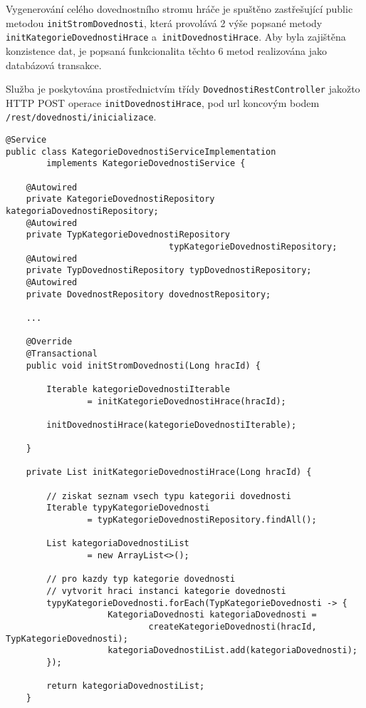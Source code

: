 \documentclass[12pt]{article}
\begin{document}
{Vygenerování celého dovednostního stromu hráče je spuštěno zastřešující public metodou \texttt{initStromDovednosti}, která provolává 2 výše popsané metody \texttt{initKategorieDovednostiHrace} a~\texttt{initDovednostiHrace}. Aby byla zajištěna konzistence dat, je popsaná funkcionalita těchto 6 metod realizována jako databázová transakce. 

Služba je poskytována prostřednictvím třídy \texttt{DovednostiRestController} jakožto HTTP POST operace \texttt{initDovednostiHrace}, pod url koncovým bodem \texttt{/rest/dovednosti/inicializace}.

\begin{lstlisting}
@Service
public class KategorieDovednostiServiceImplementation 
        implements KategorieDovednostiService {
        
    @Autowired
    private KategorieDovednostiRepository kategoriaDovednostiRepository;
    @Autowired
    private TypKategorieDovednostiRepository 
                                typKategorieDovednostiRepository;
    @Autowired
    private TypDovednostiRepository typDovednostiRepository;
    @Autowired
    private DovednostRepository dovednostRepository;
    
    ...
    
    @Override
    @Transactional
    public void initStromDovednosti(Long hracId) {
        
        Iterable kategorieDovednostiIterable
                = initKategorieDovednostiHrace(hracId);

        initDovednostiHrace(kategorieDovednostiIterable);

    }
    
    private List initKategorieDovednostiHrace(Long hracId) {

        // ziskat seznam vsech typu kategorii dovednosti
        Iterable typyKategorieDovednosti
                = typKategorieDovednostiRepository.findAll();
    
        List kategoriaDovednostiList
                = new ArrayList<>();
    
        // pro kazdy typ kategorie dovednosti
        // vytvorit hraci instanci kategorie dovednosti
        typyKategorieDovednosti.forEach(TypKategorieDovednosti -> {
                    KategoriaDovednosti kategoriaDovednosti =
                            createKategorieDovednosti(hracId, TypKategorieDovednosti);
                    kategoriaDovednostiList.add(kategoriaDovednosti);
        });

        return kategoriaDovednostiList;
    }
    

\end{lstlisting}}
\end{document}
